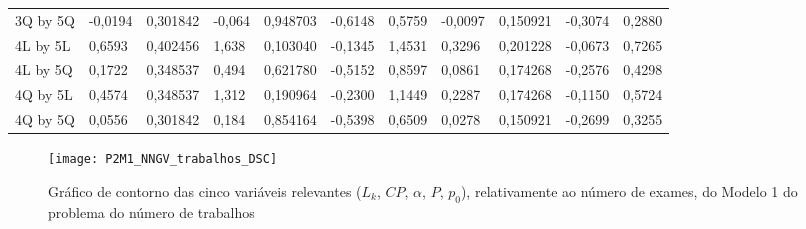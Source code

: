 \begin{table}[H]
{\begin{tabular}{lllllllllll}
\rowcolor[HTML]{FFFFFF} 
3Q by 5Q       & -0,0194                         & 0,301842                        & -0,064                          & 0,948703                        & -0,6148                         & 0,5759                          & -0,0097                         & 0,150921                        & -0,3074                         & 0,2880                          \\
\rowcolor[HTML]{FFFFFF} 
4L by 5L       & 0,6593                          & 0,402456                        & 1,638                           & 0,103040                        & -0,1345                         & 1,4531                          & 0,3296                          & 0,201228                        & -0,0673                         & 0,7265                          \\
\rowcolor[HTML]{FFFFFF} 
4L by 5Q       & 0,1722                          & 0,348537                        & 0,494                           & 0,621780                        & -0,5152                         & 0,8597                          & 0,0861                          & 0,174268                        & -0,2576                         & 0,4298                          \\
\rowcolor[HTML]{FFFFFF} 
4Q by 5L       & 0,4574                          & 0,348537                        & 1,312                           & 0,190964                        & -0,2300                         & 1,1449                          & 0,2287                          & 0,174268                        & -0,1150                         & 0,5724                          \\
\rowcolor[HTML]{FFFFFF} 
4Q by 5Q       & 0,0556                          & 0,301842                        & 0,184                           & 0,854164                        & -0,5398                         & 0,6509                          & 0,0278                          & 0,150921                        & -0,2699                         & 0,3255                         
\end{tabular}
}
\end{table}

\begin{figure}[H]
\caption{Gráfico de contorno das cinco variáveis relevantes ($L_{k}$, $CP$, $\alpha$, $P$, $p_{0}$), relativamente ao número de exames, do Modelo 1 do problema do número de trabalhos}
\centering
\texttt{[image: P2M1\_NNGV\_trabalhos\_DSC]}
\end{figure}

